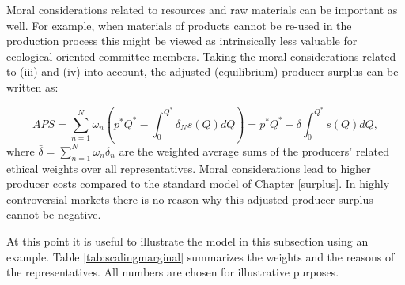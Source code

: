 \documentclass[
]{book}
\begin{document}
Moral considerations related to resources and raw materials can be important as well. For example, when materials of products cannot be re-used in the production process this might be viewed as intrinsically less valuable for ecological oriented committee members. Taking the moral considerations related to (iii) and (iv) into account, the adjusted (equilibrium) producer surplus can be written as:

\begin{equation}
APS = \sum_{n=1}^N \omega_n \left(p^*Q^* - \int_0^{Q^*}\delta_N s(Q) dQ\right)= p^*Q^* - \bar{\delta} \int_0^{Q^*} s(Q) dQ,
\end{equation}
where \(\bar{\delta} = \sum^N_{n=1}\omega_n \delta_n\) are the weighted average sums of the producers' related ethical weights over all representatives. Moral considerations lead to higher producer costs compared to the standard model of Chapter \ref{surplus}. In highly controversial markets there is no reason why this adjusted producer surplus cannot be negative.

At this point it is useful to illustrate the model in this subsection using an example. Table \ref{tab:scalingmarginal} summarizes the weights and the reasons of the representatives. All numbers are chosen for illustrative purposes.
\end{document}

